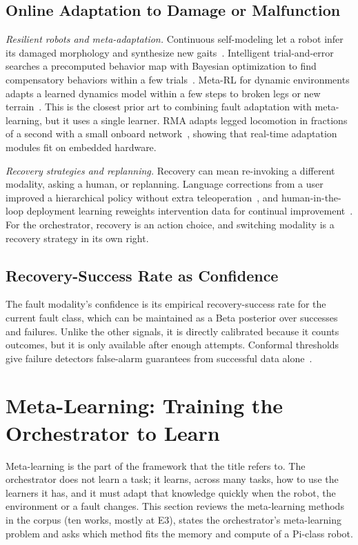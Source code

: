 \documentclass[journal]{IEEEtran}
\begin{document}
\subsection{Online Adaptation to Damage or Malfunction}\label{sec:damage}
\textit{Resilient robots and meta-adaptation.} Continuous self-modeling let a robot infer its damaged morphology and synthesize new gaits~\cite{Bongard2006}. Intelligent trial-and-error searches a precomputed behavior map with Bayesian optimization to find compensatory behaviors within a few trials~\cite{Cully2015}. Meta-RL for dynamic environments adapts a learned dynamics model within a few steps to broken legs or new terrain~\cite{Nagabandi2019}. This is the closest prior art to combining fault adaptation with meta-learning, but it uses a single learner. RMA adapts legged locomotion in fractions of a second with a small onboard network~\cite{Kumar2021}, showing that real-time adaptation modules fit on embedded hardware.

\textit{Recovery strategies and replanning.} Recovery can mean re-invoking a different modality, asking a human, or replanning. Language corrections from a user improved a hierarchical policy without extra teleoperation~\cite{Shi2024}, and human-in-the-loop deployment learning reweights intervention data for continual improvement~\cite{Liu2023}. For the orchestrator, recovery is an action choice, and switching modality is a recovery strategy in its own right.


\subsection{Recovery-Success Rate as Confidence}\label{sec:recovery}
The fault modality's confidence is its empirical recovery-success rate for the current fault class, which can be maintained as a Beta posterior over successes and failures. Unlike the other signals, it is directly calibrated because it counts outcomes, but it is only available after enough attempts. Conformal thresholds give failure detectors false-alarm guarantees from successful data alone~\cite{Xu2025,Romer2025}.


\section{Meta-Learning: Training the Orchestrator to Learn}\label{sec:meta}
Meta-learning is the part of the framework that the title refers to. The orchestrator does not learn a task; it learns, across many tasks, how to use the learners it has, and it must adapt that knowledge quickly when the robot, the environment or a fault changes. This section reviews the meta-learning methods in the corpus (ten works, mostly at E3), states the orchestrator's meta-learning problem and asks which method fits the memory and compute of a Pi-class robot.
\end{document}
